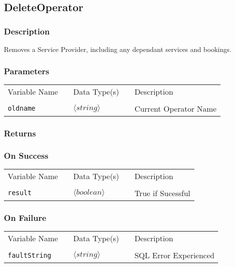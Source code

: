 \subsection{DeleteOperator}

\subsubsection{Description}

Removes a Service Provider, including any dependant services and
bookings.  

\subsubsection{Parameters}

\begin{tabular}{lllll}
Variable Name	&		&	Data Type(s)		&	&	Description	\\
				&	&	&	&	\\
\verb!oldname! & \hspace{15mm} & $\langle string\rangle $ & \hspace{15mm} & Current Operator Name \\
\end{tabular}

\subsubsection{Returns}

\subsubsection{On Success}

\begin{tabular}{lllll}
Variable Name	&		&	Data Type(s)		&	&	Description	\\
				&	&	&	&	\\
\verb!result! & \hspace{15mm} & $\langle boolean\rangle $ & \hspace{15mm} & True if Sucessful \\
\end{tabular}

\subsubsection{On Failure}

\begin{tabular}{lllll}
Variable Name	&		&	Data Type(s)		&	&	Description	\\
				&	&	&	&	\\
\verb!faultString! & \hspace{15mm} & $\langle string\rangle $ & \hspace{15mm} & SQL Error Experienced \\
\end{tabular}


